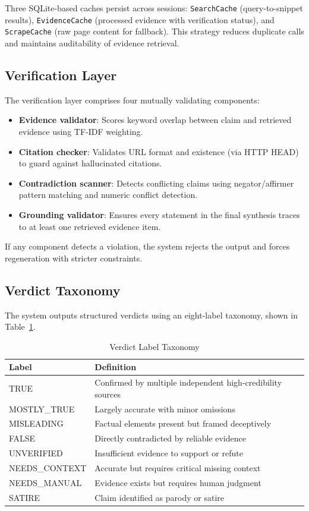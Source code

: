 \documentclass[conference]{IEEEtran}
\begin{document}
Three SQLite-based caches persist across sessions: \texttt{SearchCache} (query-to-snippet results), \texttt{EvidenceCache} (processed evidence with verification status), and \texttt{ScrapeCache} (raw page content for fallback). This strategy reduces duplicate calls and maintains auditability of evidence retrieval.

\subsection{Verification Layer}

The verification layer comprises four mutually validating components:

\begin{itemize}
    \item \textbf{Evidence validator}: Scores keyword overlap between claim and retrieved evidence using TF-IDF weighting.
    \item \textbf{Citation checker}: Validates URL format and existence (via HTTP HEAD) to guard against hallucinated citations.
    \item \textbf{Contradiction scanner}: Detects conflicting claims using negator/affirmer pattern matching and numeric conflict detection.
    \item \textbf{Grounding validator}: Ensures every statement in the final synthesis traces to at least one retrieved evidence item.
\end{itemize}

If any component detects a violation, the system rejects the output and forces regeneration with stricter constraints.

\subsection{Verdict Taxonomy}

The system outputs structured verdicts using an eight-label taxonomy, shown in Table~\ref{tab:verdict}.

\begin{table}[h]
\caption{Verdict Label Taxonomy}
\label{tab:verdict}
\centering
\begin{tabular}{p{2.2cm}p{5.4cm}}
\toprule
\textbf{Label} & \textbf{Definition} \\
\midrule
TRUE             & Confirmed by multiple independent high-credibility sources \\
MOSTLY\_TRUE     & Largely accurate with minor omissions \\
MISLEADING       & Factual elements present but framed deceptively \\
FALSE            & Directly contradicted by reliable evidence \\
UNVERIFIED       & Insufficient evidence to support or refute \\
NEEDS\_CONTEXT   & Accurate but requires critical missing context \\
NEEDS\_MANUAL    & Evidence exists but requires human judgment \\
SATIRE           & Claim identified as parody or satire \\
\bottomrule
\end{tabular}
\end{table}
\end{document}
